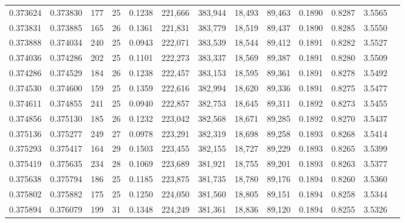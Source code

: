 \begin{tabular}{rrrrrrrrrrrrr}
0.373624 & 0.373830 &   177 &  25 &                                     0.1238 & 221,666 & 383,944 &  18,493 &  89,463 & 0.1890 & 0.8287 & 3.5565 \\
0.373831 & 0.373885 &   165 &  26 &                                     0.1361 & 221,831 & 383,779 &  18,519 &  89,437 & 0.1890 & 0.8285 & 3.5550 \\
0.373888 & 0.374034 &   240 &  25 &                                     0.0943 & 222,071 & 383,539 &  18,544 &  89,412 & 0.1891 & 0.8282 & 3.5527 \\
0.374036 & 0.374286 &   202 &  25 &                                     0.1101 & 222,273 & 383,337 &  18,569 &  89,387 & 0.1891 & 0.8280 & 3.5509 \\
0.374286 & 0.374529 &   184 &  26 &                                     0.1238 & 222,457 & 383,153 &  18,595 &  89,361 & 0.1891 & 0.8278 & 3.5492 \\
0.374530 & 0.374600 &   159 &  25 &                                     0.1359 & 222,616 & 382,994 &  18,620 &  89,336 & 0.1891 & 0.8275 & 3.5477 \\
0.374611 & 0.374855 &   241 &  25 &                                     0.0940 & 222,857 & 382,753 &  18,645 &  89,311 & 0.1892 & 0.8273 & 3.5455 \\
0.374856 & 0.375130 &   185 &  26 &                                     0.1232 & 223,042 & 382,568 &  18,671 &  89,285 & 0.1892 & 0.8270 & 3.5437 \\
0.375136 & 0.375277 &   249 &  27 &                                     0.0978 & 223,291 & 382,319 &  18,698 &  89,258 & 0.1893 & 0.8268 & 3.5414 \\
0.375293 & 0.375417 &   164 &  29 &                                     0.1503 & 223,455 & 382,155 &  18,727 &  89,229 & 0.1893 & 0.8265 & 3.5399 \\
0.375419 & 0.375635 &   234 &  28 &                                     0.1069 & 223,689 & 381,921 &  18,755 &  89,201 & 0.1893 & 0.8263 & 3.5377 \\
0.375638 & 0.375794 &   186 &  25 &                                     0.1185 & 223,875 & 381,735 &  18,780 &  89,176 & 0.1894 & 0.8260 & 3.5360 \\
0.375802 & 0.375882 &   175 &  25 &                                     0.1250 & 224,050 & 381,560 &  18,805 &  89,151 & 0.1894 & 0.8258 & 3.5344 \\
0.375894 & 0.376079 &   199 &  31 &                                     0.1348 & 224,249 & 381,361 &  18,836 &  89,120 & 0.1894 & 0.8255 & 3.5326 \\

\end{tabular}
